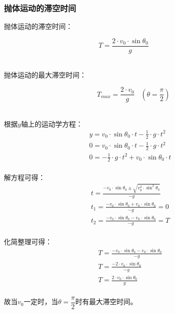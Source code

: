 \documentclass[UTF8]{ctexart}
\begin{document}
\newpage

\subsubsection{抛体运动的滞空时间}
    \setcounter{equation}{0}
    抛体运动的滞空时间：
    \begin{large}
        \begin{equation*}
            T=\frac{2\cdot v_0\cdot\sin{\theta_0}}{g}~~~~~
        \end{equation*}
    \end{large}\\
    抛体运动的最大滞空时间：
    \begin{large}
        \begin{equation*}
            ~~~~~~~~T_{max}=\frac{2\cdot v_0}{g}~~~~\left(\theta=\frac{\pi}{2}\right)
        \end{equation*}
    \end{large}\\
    根据$y$轴上的运动学方程：
    \begin{align}
        &y=v_0\cdot\sin{\theta_0}\cdot t-\frac{1}{2}\cdot g\cdot t^2\\[4mm]
        &0=v_0\cdot\sin{\theta_0}\cdot t-\frac{1}{2}\cdot g\cdot t^2\\[4mm]
        &0=-\frac{1}{2}\cdot g\cdot t^2+v_0\cdot\sin{\theta_0}\cdot t
    \end{align}\\
    解方程可得：
    \begin{align}
        &t=\frac{-v_0\cdot\sin{\theta_0}\pm\sqrt{v_0^2\cdot\sin^2{\theta_0}}}{-g}\\[4mm]
        &t_1=\frac{-v_0\cdot\sin{\theta_0}+v_0\cdot\sin{\theta_0}}{-g}=0\\[4mm]
        &t_2=\frac{-v_0\cdot\sin{\theta_0}-v_0\cdot\sin{\theta_0}}{-g}=T
    \end{align}\\
    化简整理可得：
    \begin{align}
        &T=\frac{-v_0\cdot\sin{\theta_0}-v_0\cdot\sin{\theta_0}}{-g}\\[3mm]
        &T=\frac{-2\cdot v_0\cdot\sin{\theta_0}}{-g}\\[3mm]
        &T=\frac{2\cdot v_0\cdot\sin{\theta_0}}{g}
    \end{align}\\
    故当$v_0$一定时，当$\theta=\dfrac{\pi}{2}$时有最大滞空时间。

\newpage
\end{document}
